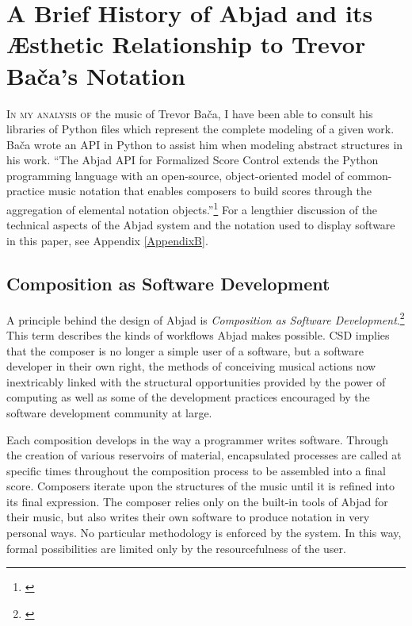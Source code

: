 \chapter{A Brief History of Abjad and its Æsthetic Relationship to Trevor Bača's Notation}
\label{AppendixC}

\lettrine[lines=2,slope=-2pt,nindent=2pt]{\textcolor{SchoolColor}{I}}{n my analysis of} the music of Trevor Ba\v{c}a, I have been able to consult his libraries of Python files which represent the complete modeling of a given work. Bača wrote an \ac{API} in Python to assist him when modeling abstract structures in his work. ``The Abjad \ac{API} for Formalized Score Control extends the Python programming language with an open-source, object-oriented model of common-practice music notation that enables composers to build scores through the aggregation of elemental notation objects.''\footnote{\citet[p.1]{abjadpaper}} For a lengthier discussion of the technical aspects of the Abjad system and the notation used to display software in this paper, see Appendix \vref{AppendixB}.

\section{Composition as Software Development}

A principle behind the design of Abjad is \textit{Composition as Software Development}.\footnote{\citet[219]{josiahpaper}} This term describes the kinds of workflows Abjad makes possible. \Ac{CSD} implies that the composer is no longer a simple user of a software, but a software developer in their own right, the methods of conceiving musical actions now inextricably linked with the structural opportunities provided by the power of computing as well as some of the development practices encouraged by the software development community at large.

Each composition develops in the way a programmer writes software. Through the creation of various reservoirs of material,  encapsulated processes are called at specific times throughout the composition process to be assembled into a final score. Composers iterate upon the structures of the music until it is refined into its final expression. The composer relies only on the built-in tools of Abjad for their music, but also writes their own software to produce notation in very personal ways. No particular methodology is enforced by the system. In this way, formal possibilities are limited only by the resourcefulness of the user.

